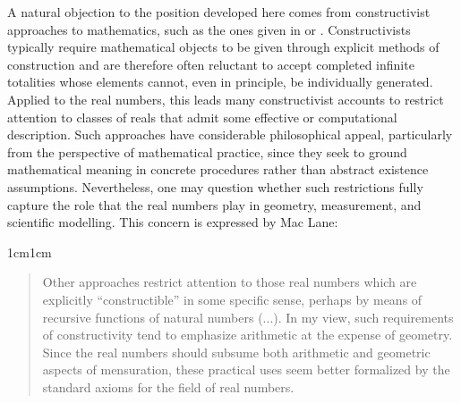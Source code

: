\documentclass[11pt,a4paper]{article}
\begin{document}
A natural objection to the position developed here comes from constructivist approaches to mathematics, such as the ones given in \textcite{Bishop1967} or \textcite{bridges1987varieties}. Constructivists typically require mathematical objects to be given through explicit methods of construction and are therefore often reluctant to accept completed infinite totalities whose elements cannot, even in principle, be individually generated. Applied to the real numbers, this leads many constructivist accounts to restrict attention to classes of reals that admit some effective or computational description. Such approaches have considerable philosophical appeal, particularly from the perspective of mathematical practice, since they seek to ground mathematical meaning in concrete procedures rather than abstract existence assumptions. Nevertheless, one may question whether such restrictions fully capture the role that the real numbers play in geometry, measurement, and scientific modelling. This concern is expressed by Mac Lane:

\begin{adjustwidth}{1cm}{1cm}
\small
\begin{quote}
Other approaches restrict attention to those real numbers which are explicitly “constructible” in some specific sense, perhaps by means of recursive functions of natural numbers (...). In my view, such requirements of constructivity tend to emphasize arithmetic at the expense of geometry. Since the real numbers should subsume both arithmetic and geometric aspects of mensuration, these practical uses seem better formalized by the standard axioms for the field of real numbers. \textcite[107]{maclane1986mathematics}
\end{quote}
\end{adjustwidth}
\end{document}
